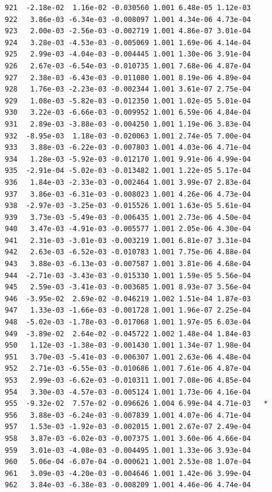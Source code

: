 \documentclass[
  letterpaper,
  DIV=11,
  numbers=noendperiod]{scrartcl}
\begin{document}
\begin{verbatim}
921  -2.18e-02  1.16e-02 -0.030560 1.001 6.48e-05 1.12e-03    
922   3.86e-03 -6.34e-03 -0.008097 1.001 4.34e-06 4.73e-04    
923   2.00e-03 -2.56e-03 -0.002719 1.001 4.86e-07 3.01e-04    
924   3.28e-03 -4.53e-03 -0.005069 1.001 1.69e-06 4.14e-04    
925   2.99e-03 -4.04e-03 -0.004445 1.001 1.30e-06 3.91e-04    
926   2.67e-03 -6.54e-03 -0.010735 1.001 7.68e-06 4.87e-04    
927   2.38e-03 -6.43e-03 -0.011080 1.001 8.19e-06 4.89e-04    
928   1.76e-03 -2.23e-03 -0.002344 1.001 3.61e-07 2.75e-04    
929   1.08e-03 -5.82e-03 -0.012350 1.001 1.02e-05 5.01e-04    
930   3.22e-03 -6.66e-03 -0.009952 1.001 6.59e-06 4.84e-04    
931   2.89e-03 -3.88e-03 -0.004250 1.001 1.19e-06 3.83e-04    
932  -8.95e-03  1.18e-03 -0.020063 1.001 2.74e-05 7.00e-04    
933   3.88e-03 -6.22e-03 -0.007803 1.001 4.03e-06 4.71e-04    
934   1.28e-03 -5.92e-03 -0.012170 1.001 9.91e-06 4.99e-04    
935  -2.91e-04 -5.02e-03 -0.013482 1.001 1.22e-05 5.17e-04    
936   1.84e-03 -2.33e-03 -0.002464 1.001 3.99e-07 2.83e-04    
937   3.86e-03 -6.31e-03 -0.008023 1.001 4.26e-06 4.73e-04    
938  -2.97e-03 -3.25e-03 -0.015526 1.001 1.63e-05 5.61e-04    
939   3.73e-03 -5.49e-03 -0.006435 1.001 2.73e-06 4.50e-04    
940   3.47e-03 -4.91e-03 -0.005577 1.001 2.05e-06 4.30e-04    
941   2.31e-03 -3.01e-03 -0.003219 1.001 6.81e-07 3.31e-04    
942   2.63e-03 -6.52e-03 -0.010783 1.001 7.75e-06 4.88e-04    
943   3.88e-03 -6.13e-03 -0.007587 1.001 3.81e-06 4.68e-04    
944  -2.71e-03 -3.43e-03 -0.015330 1.001 1.59e-05 5.56e-04    
945   2.59e-03 -3.41e-03 -0.003685 1.001 8.93e-07 3.56e-04    
946  -3.95e-02  2.69e-02 -0.046219 1.002 1.51e-04 1.87e-03    
947   1.33e-03 -1.66e-03 -0.001728 1.001 1.96e-07 2.25e-04    
948  -5.02e-03 -1.78e-03 -0.017068 1.001 1.97e-05 6.03e-04    
949  -3.89e-02  2.64e-02 -0.045722 1.002 1.48e-04 1.84e-03    
950   1.12e-03 -1.38e-03 -0.001430 1.001 1.34e-07 1.98e-04    
951   3.70e-03 -5.41e-03 -0.006307 1.001 2.63e-06 4.48e-04    
952   2.71e-03 -6.55e-03 -0.010686 1.001 7.61e-06 4.87e-04    
953   2.99e-03 -6.62e-03 -0.010311 1.001 7.08e-06 4.85e-04    
954   3.30e-03 -4.57e-03 -0.005124 1.001 1.73e-06 4.16e-04    
955  -9.32e-02  7.57e-02 -0.096626 1.004 6.99e-04 4.71e-03   *
956   3.88e-03 -6.24e-03 -0.007839 1.001 4.07e-06 4.71e-04    
957   1.53e-03 -1.92e-03 -0.002015 1.001 2.67e-07 2.49e-04    
958   3.87e-03 -6.02e-03 -0.007375 1.001 3.60e-06 4.66e-04    
959   3.01e-03 -4.08e-03 -0.004495 1.001 1.33e-06 3.93e-04    
960   5.06e-04 -6.07e-04 -0.000621 1.001 2.53e-08 1.07e-04    
961   3.09e-03 -4.20e-03 -0.004646 1.001 1.42e-06 3.99e-04    
962   3.84e-03 -6.38e-03 -0.008209 1.001 4.46e-06 4.74e-04    

\end{verbatim}
\end{document}
